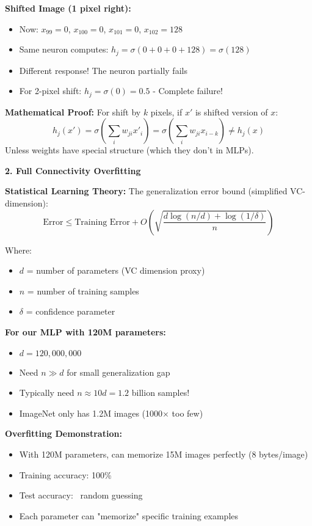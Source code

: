\documentclass[12pt]{article}
\newcommand{\explanation}[1]{{\color{explanationcolor}#1}}
\begin{document}
\begin{enumerate}[(a)]
{{    \textbf{Shifted Image (1 pixel right):}
    \begin{itemize}
        \item Now: $x_{99} = 0$, $x_{100} = 0$, $x_{101} = 0$, $x_{102} = 128$
        \item Same neuron computes: $h_j = \sigma(0 + 0 + 0 + 128) = \sigma(128)$
        \item Different response! The neuron partially fails
        \item For 2-pixel shift: $h_j = \sigma(0) = 0.5$ - Complete failure!
    \end{itemize}
    
    \textbf{Mathematical Proof:}
    For shift by $k$ pixels, if $x'$ is shifted version of $x$:
    \[h_j(x') = \sigma(\sum_i w_{ji} x'_i) = \sigma(\sum_i w_{ji} x_{i-k}) \neq h_j(x)\]
    Unless weights have special structure (which they don't in MLPs).
    }
    
    \textbf{2. Full Connectivity Overfitting}
    
    \explanation{
    \textbf{Statistical Learning Theory:}
    The generalization error bound (simplified VC-dimension):
    \[\text{Error} \leq \text{Training Error} + O\left(\sqrt{\frac{d \log(n/d) + \log(1/\delta)}{n}}\right)\]
    
    Where:
    \begin{itemize}
        \item $d$ = number of parameters (VC dimension proxy)
        \item $n$ = number of training samples
        \item $\delta$ = confidence parameter
    \end{itemize}
    
    \textbf{For our MLP with 120M parameters:}
    \begin{itemize}
        \item $d = 120,000,000$
        \item Need $n \gg d$ for small generalization gap
        \item Typically need $n \approx 10d = 1.2$ billion samples!
        \item ImageNet only has 1.2M images (1000× too few)
    \end{itemize}
    
    \textbf{Overfitting Demonstration:}
    \begin{itemize}
        \item With 120M parameters, can memorize 15M images perfectly (8 bytes/image)
        \item Training accuracy: 100\%
        \item Test accuracy: ~random guessing
        \item Each parameter can "memorize" specific training examples
    \end{itemize}
    }
    
}
\end{enumerate}
\end{document}
